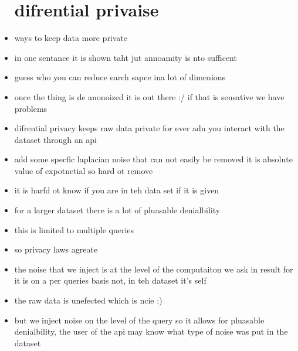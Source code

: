 \documentclass{article}
\begin{document}
\begin{itemize}
\section*{difrential privaise }
\item ways to keep data more private 
\item in one sentance it is shown taht jut annoamity is nto sufficent 
\item guess who you can reduce earch sapce ina  lot of dimenions
\item once the thing is de anonoized it is out there :/ if that is sensative we have problems 
\item difrential privacy keeps raw data private for ever adn you interact with the dataset through an api
\item add some specfic laplacian noise that can not easily be removed it is absolute value of expotnetial so hard ot remove 
\item it is harfd ot know if you are in teh data set if it is given 
\item for a larger dataset there is a lot of pluasable denialbility 
\item this is limited to multiple queries 
\item so privacy laws agreate
\item the noise that we inject is at the level of the computaiton we ask in result for it is on a per queries basis not, in teh dataset it's self 
\item the raw data is unefected which is ncie :)
\item but we inject noise on the level of the query so it allows for pluasable denialbility, the user of the api may know what type of noise was put in the dataset

\end{itemize}
\end{document}

